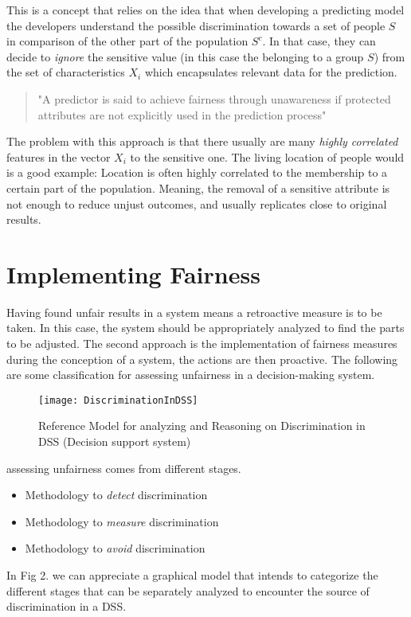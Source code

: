 This is a concept that relies on the idea that when developing a predicting model the developers understand the possible discrimination towards a set of people $S$ in comparison of the other part of the population $S^c$. In that case, they can decide to \textsl{ignore} the sensitive value (in this case the belonging to a group $S$) from the set of characteristics $X_i$ which encapsulates relevant data for the prediction.
\begin{quote}"A predictor is said to achieve fairness through unawareness if protected attributes are not explicitly used in the prediction process" \cite{GaPe17}\end{quote}

The problem with this approach is that there usually are many \textsl{highly correlated} features in the vector $X_i$ to the sensitive one. The living location of people would is a good example: Location is often highly correlated to the membership to a certain part of the population. Meaning, the removal of a sensitive attribute is not enough to reduce unjust outcomes, and usually replicates close to original results.

\section{Implementing Fairness}
Having found unfair results in a system means a retroactive measure is to be taken. In this case, the system should be appropriately analyzed to find the parts to be adjusted. The second approach is the implementation of fairness measures during the conception of a system, the actions are then proactive. The following are some classification for assessing unfairness in a decision-making system.
\label{ImplementingFairness}
\begin{figure}[h!]
  \caption{Reference Model for analyzing and Reasoning on Discrimination in DSS (Decision support system) \cite{PRT09}}
  \texttt{[image: DiscriminationInDSS]}
  \label{DSS}
\end{figure}
assessing unfairness comes from different stages.
\begin {itemize}
  \item Methodology to \textsl{detect} discrimination
  \item Methodology to \textsl{measure} discrimination
  \item Methodology to \textsl{avoid} discrimination
\end{itemize}
In Fig 2. we can appreciate a graphical model that intends to categorize the different stages that can be separately analyzed to encounter the source of discrimination in a DSS.\cite{PRT09}
